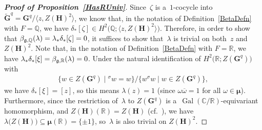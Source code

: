 \documentclass[11pt]{article}
\DeclareMathOperator{\Gal}{Gal}
\numberwithin{equation}{section}
\newcommand{\Lie}[1]{\mathfrak{\lowercase{#1}}}
\begin{document}
\begin{proof}[\bf Proof of Proposition~\ref{HasRUniv}]
Since~$\zeta$ is a~$1$-cocycle into $\widetilde{\mathbf{G}}^q = \mathbf{G}^q/\langle z, Z(\mathbf{H})^2 \rangle$, we know
that, in the notation of Def\/inition~\ref{BetaDefn} with $F = \mathbb{Q}$, we have $\delta_*[\zeta] \in H^2\bigl(\mathbb{Q};
\langle z, Z(\mathbf{H})^2 \rangle\bigr)$.
Therefore, in order to show that $\beta_{\Lie G, \mathbb{Q}}(\lambda) = \lambda_* \delta_*[\zeta] = 0$, it suf\/f\/ices to
show that~$\lambda$ is trivial on both~$z$ and~$Z(\mathbf{H})^2$.
Note that, in the notation of Def\/inition~\ref{BetaDefn} with $F = \mathbb{R}$, we have $\lambda_* \delta_*[\xi] = \beta_{\Lie G,
\mathbb{R}}(\lambda) = 0$.
Under the natural identif\/ication of $H^2 \bigl(\mathbb{R}; Z(\mathbf{G}^q) \bigr)$ with
\begin{gather*}
\{ w \in Z(\mathbf{G}^q) \mid {}^\sigma w = w \} / \{ w {}^\sigma w \mid w \in Z(\mathbf{G}^q) \},
\end{gather*}
we have $\delta_* [\xi] = [z]$, so this means $\lambda(z) = 1$ (since $\omega \overline{\omega} = 1$ for all $\omega \in
\boldsymbol\mu$).
Furthermore, since the restriction of~$\lambda$ to $Z(\mathbf{G}^q)$ is a~$\Gal(\mathbb{C}/\mathbb{R})$-equivariant
homomorphism, and $Z(\mathbf{H})(\mathbb{R}) = Z(\mathbf{H})$ (cf.~\cite[p.~332]{PlatonovRapinchukBook}), we have
$\lambda \bigl(Z(\mathbf{H}) \bigr) \subseteq \boldsymbol\mu(\mathbb{R}) = \{\pm1\}$, so~$\lambda$ is also trivial on
$Z(\mathbf{H})^2$.
\end{proof}
\end{document}
